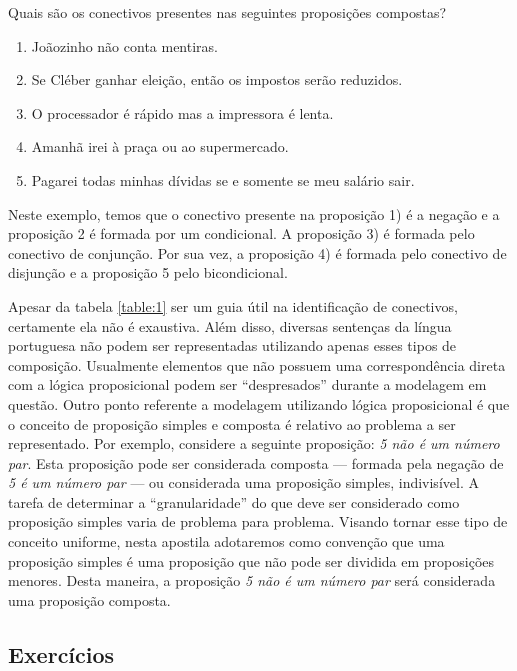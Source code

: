 \begin{Example}
  Quais s\~ao os conectivos presentes nas seguintes proposi\c{c}\~oes compostas?
    \begin{enumerate}
    \item Jo\~aozinho n\~ao conta mentiras.
    \item Se Cl\'eber ganhar elei\c{c}\~ao, ent\~ao os impostos ser\~ao reduzidos.
    \item O processador \'e r\'apido mas a impressora \'e lenta.
    \item Amanh\~a irei \`a pra\c{c}a ou ao supermercado.
    \item Pagarei todas minhas d\'ividas se e somente se meu sal\'ario sair.
  \end{enumerate}
  Neste exemplo, temos que o conectivo presente na proposi\c{c}\~ao 1) \'e a nega\c{c}\~ao e a proposi\c{c}\~ao 2 \'e formada por um condicional.
  A proposi\c{c}\~ao 3) \'e formada pelo conectivo de conjun\c{c}\~ao. Por sua vez, a proposi\c{c}\~ao 4) \'e formada pelo conectivo 
  de disjun\c{c}\~ao e a proposi\c{c}\~ao 5 pelo bicondicional.
\end{Example}

Apesar da tabela \ref{table:1} ser um guia \'util na identifica\c{c}\~ao de conectivos, certamente ela n\~ao \'e exaustiva. Al\'em disso,
diversas senten\c{c}as da l\'ingua portuguesa n\~ao podem ser representadas utilizando apenas esses tipos de composi\c{c}\~ao. Usualmente
elementos que n\~ao possuem uma correspond\^encia direta com a l\'ogica proposicional podem ser ``despresados'' durante a modelagem em
quest\~ao. Outro ponto referente a modelagem utilizando l\'ogica proposicional \'e que o conceito de proposi\c{c}\~ao simples e composta
\'e relativo ao problema a ser representado. Por exemplo, considere a seguinte proposi\c{c}\~ao: \textit{5 n\~ao \'e um n\'umero par}. Esta
proposi\c{c}\~ao pode ser considerada composta --- formada pela nega\c{c}\~ao de \textit{5 \'e um n\'umero par} --- ou considerada uma 
proposi\c{c}\~ao simples, indivis\'ivel. A tarefa de determinar a ``granularidade'' do que deve ser considerado como proposi\c{c}\~ao
simples varia de problema para problema. Visando tornar esse tipo de conceito uniforme, nesta apostila adotaremos como conven\c{c}\~ao que
uma proposi\c{c}\~ao simples \'e uma proposi\c{c}\~ao que n\~ao pode ser dividida em proposi\c{c}\~oes menores. Desta maneira, a proposi\c{c}\~ao
\textit{5 n\~ao \'e um n\'umero par} ser\'a considerada uma proposi\c{c}\~ao composta.

\subsection{Exerc\'icios}\label{cap1:ex1}

